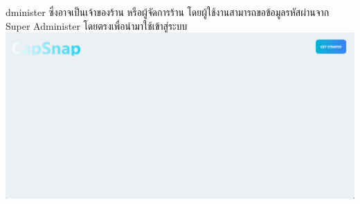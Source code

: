 dminister ซึ่งอาจเป็นเจ้าของร้าน หรือผู้จัดการร้าน โดยผู้ใช้งานสามารถขอข้อมูลรหัสผ่านจาก Super Administer โดยตรงเพื่อนำมาใช้เข้าสู่ระบบ\\
 {
  \includegraphics[scale=0.35]{pic/ui/w26.png}
 }\\
